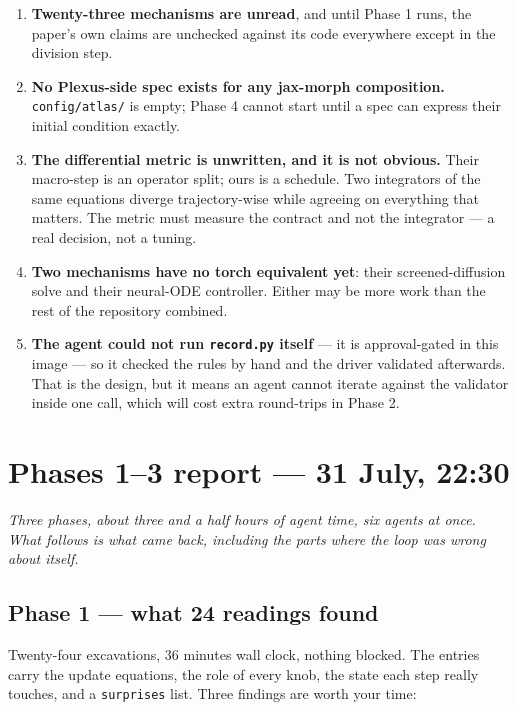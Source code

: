 \documentclass[11pt,a4paper]{article}
\newcommand{\code}[1]{\texttt{#1}}
\begin{document}
\begin{enumerate}[leftmargin=1.4em]
\item \textbf{Twenty-three mechanisms are unread}, and until Phase 1 runs, the paper's own claims
are unchecked against its code everywhere except in the division step.
\item \textbf{No Plexus-side spec exists for any jax-morph composition.} \code{config/atlas/} is
empty; Phase 4 cannot start until a spec can express their initial condition exactly.
\item \textbf{The differential metric is unwritten, and it is not obvious.} Their macro-step is an
operator split; ours is a schedule. Two integrators of the same equations diverge trajectory-wise
while agreeing on everything that matters. The metric must measure the contract and not the
integrator --- a real decision, not a tuning.
\item \textbf{Two mechanisms have no torch equivalent yet}: their screened-diffusion solve and
their neural-ODE controller. Either may be more work than the rest of the repository combined.
\item \textbf{The agent could not run \code{record.py} itself} --- it is approval-gated in this
image --- so it checked the rules by hand and the driver validated afterwards. That is the design,
but it means an agent cannot iterate against the validator inside one call, which will cost extra
round-trips in Phase 2.
\end{enumerate}

\section{Phases 1--3 report --- 31 July, 22:30}\label{sec:p13report}

\emph{Three phases, about three and a half hours of agent time, six agents at once. What follows
is what came back, including the parts where the loop was wrong about itself.}

\subsection{Phase 1 --- what 24 readings found}

Twenty-four excavations, 36 minutes wall clock, nothing blocked. The entries carry the update
equations, the role of every knob, the state each step really touches, and a \code{surprises}
list. Three findings are worth your time:
\end{document}
